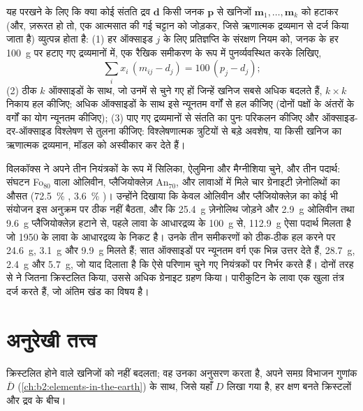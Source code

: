 \begin{method}[न्यूनतम-वर्ग द्रव्यमान-संतुलन]\label{met:b2:magmatic-differentiation:massbalance}
यह परखने के लिए कि क्या कोई संतति द्रव $\mathbf d$ किसी जनक $\mathbf p$ से
खनिजों $\mathbf m_1, \dots, \mathbf m_k$ को हटाकर (और, ज़रूरत हो तो, एक
आत्मसात की गई चट्टान को जोड़कर, जिसे ऋणात्मक द्रव्यमान से दर्ज किया जाता है) व्युत्पन्न होता है: (1) हर ऑक्साइड $j$ के लिए
प्रतिज्ञप्ति के संरक्षण नियम को, जनक के हर \qty{100}{g} पर हटाए गए द्रव्यमानों में,
एक रैखिक समीकरण के रूप में पुनर्व्यवस्थित करके लिखिए,
\[
\sum_i x_i\,(m_{ij} - d_j) = 100\,(p_j - d_j);
\]
(2) ठीक $k$ ऑक्साइडों के साथ, जो उनमें से चुने गए हों जिन्हें खनिज सबसे अधिक बदलते हैं,
$k \times k$ निकाय हल कीजिए; अधिक ऑक्साइडों के साथ इसे न्यूनतम वर्गों से हल कीजिए (दोनों पक्षों के
अंतरों के वर्गों का योग न्यूनतम कीजिए); (3) पाए गए द्रव्यमानों से संतति का
पुनः परिकलन कीजिए और ऑक्साइड-दर-ऑक्साइड विश्लेषण से तुलना कीजिए: विश्लेषणात्मक
त्रुटियों से बड़े अवशेष, या किसी खनिज का ऋणात्मक द्रव्यमान, मॉडल को अस्वीकार कर देते हैं।
\end{method}

विलकॉक्स ने अपने तीन नियंत्रकों के रूप में सिलिका, ऐलुमिना और मैग्नीशिया चुने, और तीन
पदार्थ: संघटन Fo$_{80}$ वाला ओलिवीन, प्लैजियोक्लेज़ An$_{70}$, और लावाओं में मिले
चार ग्रेनाइटी ज़ेनोलिथों का औसत (\qty{72.5}{\percent} , \qty{3.6}{\percent}
)। उन्होंने दिखाया कि केवल ओलिवीन और प्लैजियोक्लेज़ का कोई भी संयोजन
इस अनुक्रम पर ठीक नहीं बैठता, और कि \qty{25.4}{g} ज़ेनोलिथ जोड़ने और
\qty{2.9}{g} ओलिवीन तथा \qty{9.6}{g} प्लैजियोक्लेज़ हटाने से, पहले लावा के
आधारद्रव्य के \qty{100}{g} से, \qty{112.9}{g} ऐसा पदार्थ मिलता है जो
1950 के लावा के आधारद्रव्य के निकट है। उनके तीन समीकरणों को ठीक-ठीक हल करने पर
\qty{24.6}{g}, \qty{3.1}{g} और \qty{9.9}{g} मिलते हैं; सात ऑक्साइडों पर न्यूनतम वर्ग
एक भिन्न उत्तर देते हैं, \qty{28.7}{g}, \qty{2.4}{g} और \qty{5.7}{g}, जो याद दिलाता है
कि ऐसे परिणाम चुने गए नियंत्रकों पर निर्भर करते हैं। दोनों तरह से  ने जितना
क्रिस्टलित किया, उससे अधिक ग्रेनाइट ग्रहण किया। पारीकुटिन के लावा एक खुला तंत्र दर्ज करते हैं,
जो अंतिम खंड का विषय है।

\section{अनुरेखी तत्त्व}\label{sec:b2:magmatic-differentiation:trace}

 क्रिस्टलित होने वाले खनिजों को नहीं बदलता; वह उनका अनुसरण करता है,
अपने समग्र विभाजन गुणांक $\bar D$ (\cref{ch:b2:elements-in-the-earth}) के साथ,
जिसे यहाँ $D$ लिखा गया है, हर क्षण बनते क्रिस्टलों और द्रव के बीच।

